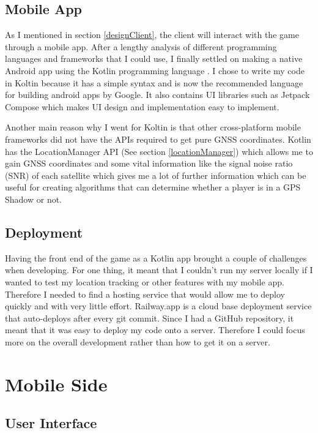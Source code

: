 \documentclass{l4proj}
\begin{document}
\subsection{Mobile App}
As I mentioned in section \ref{designClient}, the client will interact with the game through a mobile app. After a lengthy
analysis of different programming languages and frameworks that I could use, I finally settled on making a native Android
app using the Kotlin programming language \citep{kotlin}. I chose to write my code in Koltin because it has a simple syntax
and is now the recommended language for building android apps by Google. It also contains UI libraries such as Jetpack Compose 
which makes UI design and implementation easy to implement.

Another main reason why I went for Koltin is that other cross-platform mobile frameworks did not have the APIs required
to get pure GNSS coordinates. Kotlin has the LocationManager API (See section \ref{locationManager}) which allows me
to gain GNSS coordinates and some vital information like the signal noise ratio (SNR) of each satellite \citep{locationManager}
which gives me a lot of further information which can be useful for creating algorithms that can determine whether a player
is in a GPS Shadow or not.

\subsection{Deployment}
\label{deployment}
Having the front end of the game as a Kotlin app brought a couple of challenges when developing. For one thing, it meant
that I couldn't run my server locally if I wanted to test my location tracking or other features with my mobile app. Therefore
I needed to find a hosting service that would allow me to deploy quickly and with very little effort. Railway.app \citep{railway}
is a cloud base deployment service that auto-deploys after every git commit. Since I had a GitHub repository, it meant that it was
easy to deploy my code onto a server. Therefore I could focus more on the overall development rather than how to get it on a server.

\section{Mobile Side}

\subsection{User Interface}
\label{implementationui}
\end{document}
